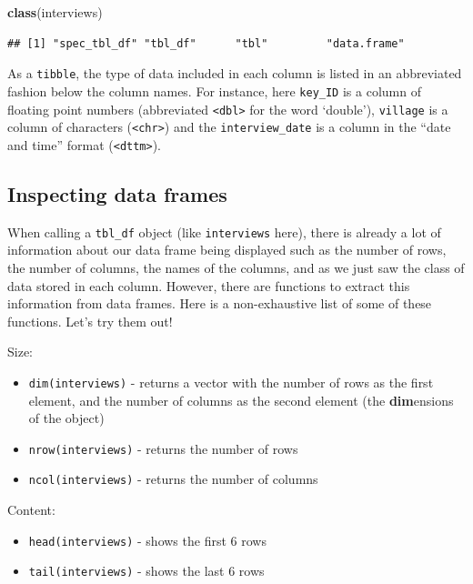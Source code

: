 \documentclass[
]{article}
\newenvironment{Shaded}{\begin{snugshade}}{\end{snugshade}}
\newcommand{\FunctionTok}[1]{\textcolor[rgb]{0.13,0.29,0.53}{\textbf{#1}}}
\newcommand{\NormalTok}[1]{#1}
\providecommand{\tightlist}{%
  \setlength{\itemsep}{0pt}\setlength{\parskip}{0pt}}
\begin{document}
\begin{Shaded}
\begin{Highlighting}[]
\FunctionTok{class}\NormalTok{(interviews)}
\end{Highlighting}
\end{Shaded}

\begin{verbatim}
## [1] "spec_tbl_df" "tbl_df"      "tbl"         "data.frame"
\end{verbatim}

As a \texttt{tibble}, the type of data included in each column is listed
in an abbreviated fashion below the column names. For instance, here
\texttt{key\_ID} is a column of floating point numbers (abbreviated
\texttt{\textless{}dbl\textgreater{}} for the word `double'),
\texttt{village} is a column of characters
(\texttt{\textless{}chr\textgreater{}}) and the \texttt{interview\_date}
is a column in the ``date and time'' format
(\texttt{\textless{}dttm\textgreater{}}).

\subsection{Inspecting data frames}\label{inspecting-data-frames}

When calling a \texttt{tbl\_df} object (like \texttt{interviews} here),
there is already a lot of information about our data frame being
displayed such as the number of rows, the number of columns, the names
of the columns, and as we just saw the class of data stored in each
column. However, there are functions to extract this information from
data frames. Here is a non-exhaustive list of some of these functions.
Let's try them out!

Size:

\begin{itemize}
\tightlist
\item
  \texttt{dim(interviews)} - returns a vector with the number of rows as
  the first element, and the number of columns as the second element
  (the \textbf{dim}ensions of the object)
\item
  \texttt{nrow(interviews)} - returns the number of rows
\item
  \texttt{ncol(interviews)} - returns the number of columns
\end{itemize}

Content:

\begin{itemize}
\tightlist
\item
  \texttt{head(interviews)} - shows the first 6 rows
\item
  \texttt{tail(interviews)} - shows the last 6 rows
\end{itemize}
\end{document}
